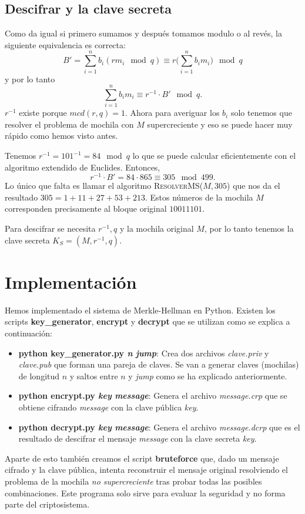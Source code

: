 \documentclass[12pt]{article}
\newenvironment{example}[1][Ejemplo]{\begin{trivlist}
\item[\hskip \labelsep {\bfseries #1}]}{\end{trivlist}}
\begin{document}
\subsection*{Descifrar y la clave secreta}
Como da igual si primero sumamos y después tomamos modulo o al revés, la siguiente equivalencia es correcta:
$$B' = \sum_{i=1}^nb_i(rm_i \mod q) \equiv r\big(\sum_{i=1}^nb_im_i\big)\mod q$$
y por lo tanto
$$\sum_{i=1}^nb_im_i \equiv r^{-1} \cdot B' \mod q.$$
$r^{-1}$ existe porque $mcd(r,q) = 1$. Ahora para averiguar los $b_i$ solo tenemos que resolver el problema de mochila con $M$ supercreciente y eso se puede hacer muy rápido como hemos visto antes.

\begin{example}
Tenemos $r^{-1} = 101^{-1}= 84 \mod q$ lo que se puede calcular eficientemente con el algoritmo extendido de Euclides. Entonces,
$$r^{-1} \cdot B' = 84 \cdot 865 \equiv 305 \mod 499.$$
Lo único que falta es llamar el algoritmo \textsc{ResolverMS}($M, 305$) que nos da el resultado $305 = 1 + 11 + 27 + 53 + 213$. Estos números de la mochila $M$ corresponden precisamente al bloque original $10011101$.
\end{example}
Para descifrar se necesita $r^{-1}, q$ y la mochila original $M$, por lo tanto tenemos la clave secreta $K_S = (M, r^{-1}, q)$.

\section{Implementación}

Hemos implementado el sistema de Merkle-Hellman en Python. Existen los scripts \textbf{key\_generator}, \textbf{encrypt} y \textbf{decrypt} que se utilizan como se explica a continuación:

\begin{itemize}
	\item \textbf{python key\_generator.py \textit{n} \textit{jump}}: Crea dos archivos \textit{clave.priv} y \textit{clave.pub} que forman una pareja de claves. Se van a generar claves (mochilas) de longitud $n$ y saltos entre $n$ y \textit{jump} como se ha explicado anteriormente.
	\item \textbf{python encrypt.py \textit{key} \textit{message}}: Genera el archivo \textit{message.crp} que se obtiene cifrando \textit{message} con la clave pública \textit{key}.
	\item \textbf{python decrypt.py \textit{key} \textit{message}}: Genera el archivo \textit{message.dcrp} que es el resultado de descifrar el mensaje \textit{message} con la clave secreta \textit{key}.
\end{itemize}
Aparte de esto también creamos el script \textbf{bruteforce} que, dado un mensaje cifrado y la clave pública, intenta reconstruir el mensaje original resolviendo el problema de la mochila \emph{no supercreciente} tras probar todas las posibles combinaciones. Este programa solo sirve para evaluar la seguridad y no forma parte del criptosistema.
\end{document}
